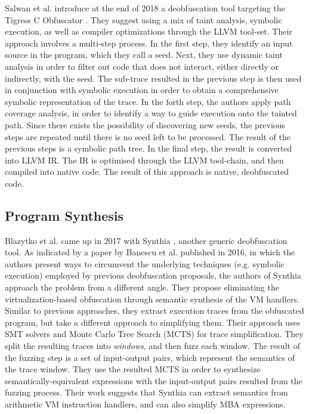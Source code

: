 Salwan et al. introduce at the end of 2018 a deobfuscation tool targeting the Tigress C Obfuscator \cite{symbolic_deobf_2018} \cite{tigress}. They suggest using a mix of taint analysis, symbolic execution, as well as compiler optimizations through the LLVM \cite{llvm} tool-set. Their approach involves a multi-step process. In the first step, they identify an input source in the program, which they call a seed. Next, they use dynamic taint analysis in order to filter out code that does not interact, either directly or indirectly, with the seed. The sub-trace resulted in the previous step is then used in conjunction with symbolic execution in order to obtain a comprehensive symbolic representation of the trace. In the forth step, the authors apply path coverage analysis, in order to identify a way to guide execution onto the tainted path. Since there exists the possibility of discovering new seeds, the previous steps are repeated until there is no seed left to be processed. The result of the previous steps is a symbolic path tree. In the final step, the result is converted into LLVM \gls{IR}. The \gls{IR} is optimised through the LLVM tool-chain, and then compiled into native code. The result of this approach is native, deobfuscated code.

\subsection{Program Synthesis}

Blazytko et al. came up in 2017 with Synthia \cite{blazytko2017}, another generic deobfuscation tool. As indicated by a paper by Banescu et al. \cite{banescu2016} published in 2016, in which the authors present ways to circumvent the underlying techniques (e.g. symbolic execution) employed by previous deobfuscation proposals, the authors of Synthia approach the problem from a different angle. They propose eliminating the virtualization-based obfuscation through semantic synthesis of the \gls{VM} handlers. Similar to previous approaches, they extract execution traces from the obfuscated program, but take a different approach to simplifying them. Their approach uses \gls{SMT} solvers and Monte Carlo Tree Search (MCTS) for trace simplification. They split the resulting traces into \emph{windows}, and then fuzz each window. The result of the fuzzing step is a set of input-output pairs, which represent the semantics of the trace window. They use the resulted MCTS in order to synthesize semantically-equivalent expressions with the input-output pairs resulted from the fuzzing process. Their work suggests that Synthia can extract semantics from arithmetic \gls{VM} instruction handlers, and can also simplify \gls{MBA} expressions.

